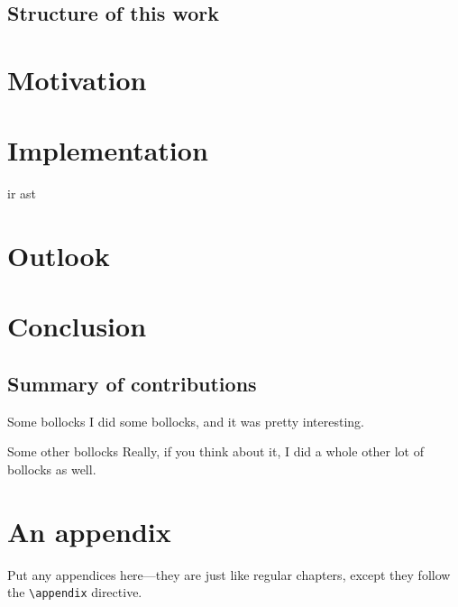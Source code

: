 \documentclass[oneside,11pt,xetex]{scrbook}
\begin{document}
\begin{onehalfspace}
\section{Structure of this work}

\chapter{Motivation}
\label{chap:motivation}


\chapter{Implementation}
\label{chap:Implementation}

  \gls{ir} \gls{ast}


\chapter{Outlook}
\label{chap:outlook}


\chapter{Conclusion}
\label{chap:conclusion}


\section{Summary of contributions}
\label{sec:summary-of-contributions}

\begin{headinglist}
\item[Some bollocks]
  I did some bollocks, and it was pretty interesting.
\item[Some other bollocks] 
  Really, if you think about it, I did a whole other lot of bollocks
  as well.
\end{headinglist}


\appendix

\chapter{An appendix}
\label{chap:an-appendix}

Put any appendices here---they are just like regular chapters, except
they follow the \texttt{\textbackslash{}appendix} directive.

\end{onehalfspace}

\backmatter


\printbibliography[title=References,heading=bibintoc]

\listoffigures

\listoftables
\end{document}
